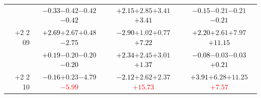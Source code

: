 \documentclass[compress]{beamer}
\begin{document}
\begin{frame}
\begin{tabular}{r | c | c | c}
          & \textcolor{black}{$-0.33$}\hspace{0.1 cm}$-0.42$\hspace{0.1 cm}$-0.42$\hspace{0.1 cm}\textcolor{black}{$-0.42$} & \textcolor{black}{$+2.15$}\hspace{0.1 cm}$+2.85$\hspace{0.1 cm}$+3.41$\hspace{0.1 cm}\textcolor{black}{$+3.41$} & \textcolor{black}{$-0.15$}\hspace{0.1 cm}$-0.21$\hspace{0.1 cm}$-0.21$\hspace{0.1 cm}\textcolor{black}{$-0.21$} \\
$+$2 2 09 & \textcolor{black}{$+2.69$}\hspace{0.1 cm}$+2.67$\hspace{0.1 cm}$+0.48$\hspace{0.1 cm}\textcolor{black}{$-2.75$} & \textcolor{black}{$-2.90$}\hspace{0.1 cm}$+1.02$\hspace{0.1 cm}$+0.77$\hspace{0.1 cm}\textcolor{black}{$+7.22$} & \textcolor{black}{$+2.20$}\hspace{0.1 cm}$+2.61$\hspace{0.1 cm}$+7.97$\hspace{0.1 cm}\textcolor{black}{$+11.15$} \\
          & \textcolor{black}{$+0.19$}\hspace{0.1 cm}$-0.20$\hspace{0.1 cm}$-0.20$\hspace{0.1 cm}\textcolor{black}{$-0.20$} & \textcolor{black}{$+2.34$}\hspace{0.1 cm}$+2.45$\hspace{0.1 cm}$+3.01$\hspace{0.1 cm}\textcolor{black}{$+1.37$} & \textcolor{black}{$-0.08$}\hspace{0.1 cm}$-0.03$\hspace{0.1 cm}$-0.03$\hspace{0.1 cm}\textcolor{black}{$+0.21$} \\
$+$2 2 10 & \textcolor{black}{$-0.16$}\hspace{0.1 cm}$+0.23$\hspace{0.1 cm}$-4.79$\hspace{0.1 cm}\textcolor{red}{$-5.99$} & \textcolor{black}{$-2.12$}\hspace{0.1 cm}$+2.62$\hspace{0.1 cm}$+2.37$\hspace{0.1 cm}\textcolor{red}{$+15.73$} & \textcolor{black}{$+3.91$}\hspace{0.1 cm}$+6.28$\hspace{0.1 cm}$+11.25$\hspace{0.1 cm}\textcolor{red}{$+7.57$} \\

\end{tabular}
\end{frame}
\end{document}
